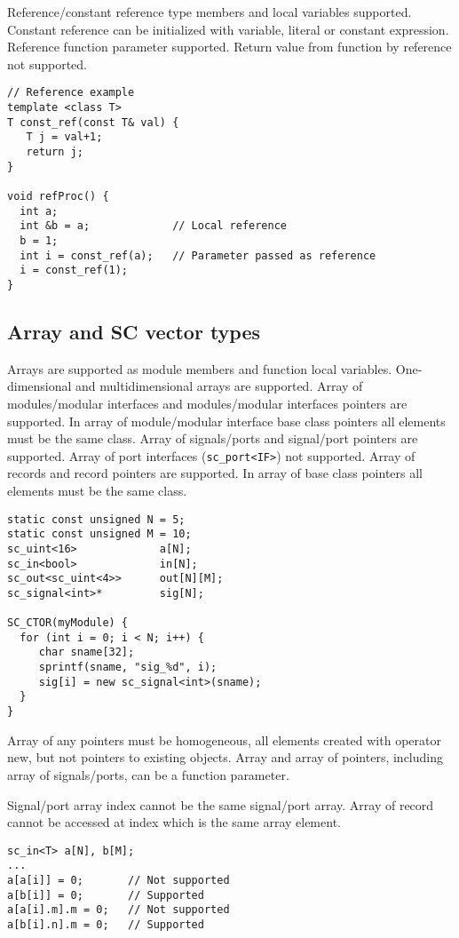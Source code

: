 Reference/constant reference type members and local variables supported. Constant reference can be initialized with variable, literal or constant expression. Reference function parameter supported. Return value from function by reference not supported. 
%
\begin{lstlisting}[style=mycpp]
// Reference example
template <class T>
T const_ref(const T& val) {
   T j = val+1;
   return j;
}

void refProc() {
  int a;
  int &b = a;             // Local reference
  b = 1;
  int i = const_ref(a);   // Parameter passed as reference
  i = const_ref(1);
}
\end{lstlisting}


\subsection{Array and SC vector types}

Arrays are supported as module members and function local variables. One-dimensional and multidimensional arrays are supported. Array of modules/modular interfaces and modules/modular interfaces pointers are supported.  In array of module/modular interface base class pointers all elements must be the same class. Array of signals/ports and signal/port pointers are supported. Array of port interfaces ({\tt sc\_port<IF>}) not supported. Array of records and record pointers are supported. In array of base class pointers all elements must be the same class.
%
\begin{lstlisting}[style=mycpp]
static const unsigned N = 5;   
static const unsigned M = 10;   
sc_uint<16>  		    a[N];
sc_in<bool>             in[N];
sc_out<sc_uint<4>>      out[N][M];
sc_signal<int>*     	sig[N];

SC_CTOR(myModule) {
  for (int i = 0; i < N; i++) {
     char sname[32];
     sprintf(sname, "sig_%d", i); 
     sig[i] = new sc_signal<int>(sname);
  }   
}
\end{lstlisting}

Array of any pointers must be homogeneous, all elements created with operator new, but not pointers to existing objects. 
Array and array of pointers, including array of signals/ports, can be a function parameter. 
 
Signal/port array index cannot be the same signal/port array. Array of record cannot be accessed at index which is the same array element.
%
\begin{lstlisting}[style=mycpp]
sc_in<T> a[N], b[M]; 
...
a[a[i]] = 0;       // Not supported 
a[b[i]] = 0;       // Supported
a[a[i].m].m = 0;   // Not supported 
a[b[i].n].m = 0;   // Supported
\end{lstlisting}

